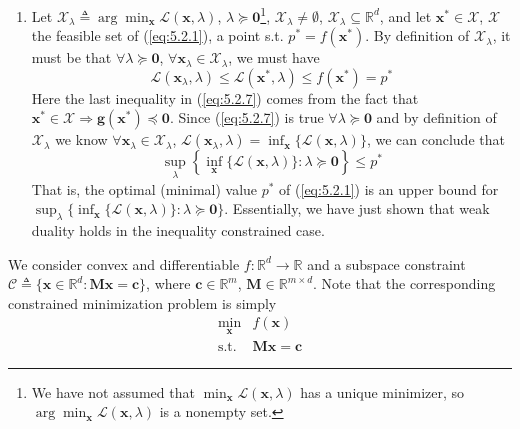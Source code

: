 \documentclass{article}
\numberwithin{equation}{section}
\begin{document}
\begin{enumerate}[label=\alph*.]
    \item
    Let $ \mathcal{X}_\lambda \triangleq
    \arg\min_\mathbf{x}\mathcal{L}(\mathbf{x}, \lambda) $,
    $ \lambda \succeq \mathbf{0} $\footnote{
        We have not assumed that
        $ \min_\mathbf{x}\mathcal{L}(\mathbf{x}, \lambda) $ has a unique
        minimizer, so $ \arg\min_\mathbf{x}\mathcal{L}(\mathbf{x}, \lambda) $
        is a nonempty set.
    }, $ \mathcal{X}_\lambda \ne \emptyset $,
    $ \mathcal{X}_\lambda \subseteq \mathbb{R}^d $, and let
    $ \mathbf{x}^* \in \mathcal{X} $, $ \mathcal{X} $ the feasible set of
    (\ref{eq:5.2.1}), a point s.t. $ p^* = f(\mathbf{x}^*) $. By definition
    of $ \mathcal{X}_\lambda $, it must be that
    $ \forall \lambda \succeq \mathbf{0} $,
    $ \forall \mathbf{x}_\lambda \in \mathcal{X}_\lambda $, we must have
    \begin{equation} \label{eq:5.2.7}
        \mathcal{L}(\mathbf{x}_\lambda, \lambda) \le
        \mathcal{L}(\mathbf{x}^*, \lambda) \le f(\mathbf{x}^*) = p^*
    \end{equation}
    Here the last inequality in (\ref{eq:5.2.7}) comes from the fact that
    $ \mathbf{x}^* \in \mathcal{X} \Rightarrow
    \mathbf{g}(\mathbf{x}^*) \preceq \mathbf{0} $. Since (\ref{eq:5.2.7}) is
    true $ \forall \lambda \succeq \mathbf{0} $ and by definition of
    $ \mathcal{X}_\lambda $ we know
    $ \forall \mathbf{x}_\lambda \in \mathcal{X}_\lambda $,
    $ \mathcal{L}(\mathbf{x}_\lambda, \lambda) =
    \inf_\mathbf{x}\{\mathcal{L}(\mathbf{x}, \lambda)\} $,
    we can conclude that
    \begin{equation} \label{eq:5.2.8}
        \sup_\lambda\left\{
            \inf_\mathbf{x}\{\mathcal{L}(\mathbf{x}, \lambda)\} :
            \lambda \succeq \mathbf{0}
        \right\} \le p^*
    \end{equation}
    That is, the optimal (minimal) value $ p^* $ of (\ref{eq:5.2.1}) is an
    upper bound for $ \sup_\lambda\{\inf_\mathbf{x}\{\mathcal{L}(\mathbf{x},
    \lambda)\} : \lambda \succeq \mathbf{0}\} $. Essentially, we have just
    shown that weak duality holds in the inequality constrained case.
\end{enumerate}


We consider convex and differentiable
$ f : \mathbb{R}^d \rightarrow \mathbb{R} $ and a subspace constraint
$ \mathcal{C} \triangleq \{\mathbf{x} \in \mathbb{R}^d : \mathbf{Mx} =
\mathbf{c}\} $, where
$ \mathbf{c} \in \mathbb{R}^m $, $ \mathbf{M} \in \mathbb{R}^{m \times d} $.
Note that the corresponding constrained minimization problem is simply
\begin{equation} \label{eq:5.3.1}
    \begin{array}{rl}
        \displaystyle\min_\mathbf{x} & f(\mathbf{x}) \\
        \text{s.t.} & \mathbf{Mx} = \mathbf{c}
    \end{array}
\end{equation}
\end{document}
